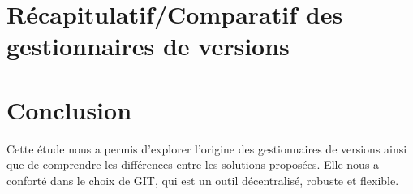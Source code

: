 \section{Récapitulatif/Comparatif des gestionnaires de versions}


\section*{Conclusion}

Cette étude nous a permis d'explorer l'origine des gestionnaires de versions ainsi que de comprendre les différences entre les solutions proposées. Elle nous a conforté dans le choix de GIT, qui est un outil décentralisé, robuste et flexible. 


